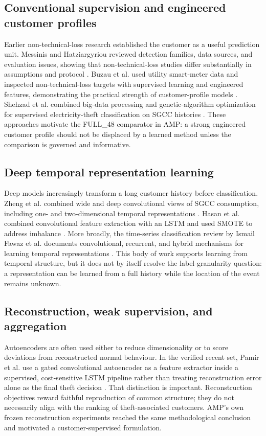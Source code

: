 \subsection{Conventional supervision and engineered customer profiles}

Earlier non-technical-loss research established the customer as a useful prediction unit. Messinis and Hatziargyriou reviewed detection families, data sources, and evaluation issues, showing that non-technical-loss studies differ substantially in assumptions and protocol \cite{Messinis2018NTLReview}. Buzau et al. used utility smart-meter data and inspected non-technical-loss targets with supervised learning and engineered features, demonstrating the practical strength of customer-profile models \cite{Buzau2019NTL}. Shehzad et al. combined big-data processing and genetic-algorithm optimization for supervised electricity-theft classification on SGCC histories \cite{Shehzad2022GeneticETD}. These approaches motivate the FULL\_48 comparator in AMP: a strong engineered customer profile should not be displaced by a learned method unless the comparison is governed and informative.

\subsection{Deep temporal representation learning}

Deep models increasingly transform a long customer history before classification. Zheng et al. combined wide and deep convolutional views of SGCC consumption, including one- and two-dimensional temporal representations \cite{Zheng2018WideDeep}. Hasan et al. combined convolutional feature extraction with an LSTM and used SMOTE to address imbalance \cite{Hasan2019CNNLSTM}. More broadly, the time-series classification review by Ismail Fawaz et al. documents convolutional, recurrent, and hybrid mechanisms for learning temporal representations \cite{Fawaz2019TimeSeriesReview}. This body of work supports learning from temporal structure, but it does not by itself resolve the label-granularity question: a representation can be learned from a full history while the location of the event remains unknown.

\subsection{Reconstruction, weak supervision, and aggregation}

Autoencoders are often used either to reduce dimensionality or to score deviations from reconstructed normal behaviour. In the verified recent set, Pamir et al. use a gated convolutional autoencoder as a feature extractor inside a supervised, cost-sensitive LSTM pipeline rather than treating reconstruction error alone as the final theft decision \cite{Pamir2023EnergyOptimization}. That distinction is important. Reconstruction objectives reward faithful reproduction of common structure; they do not necessarily align with the ranking of theft-associated customers. AMP's own frozen reconstruction experiments reached the same methodological conclusion and motivated a customer-supervised formulation.

